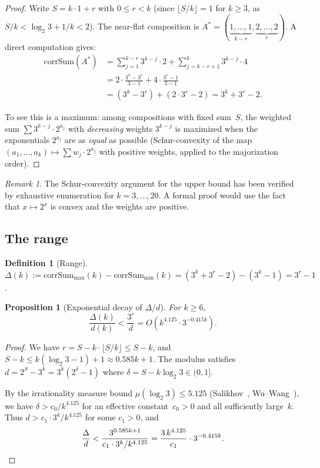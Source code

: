 \documentclass[11pt, a4paper]{amsart}
\theoremstyle{plain}
\newtheorem{proposition}[theorem]{Proposition}
\theoremstyle{definition}
\newtheorem{definition}[theorem]{Definition}
\theoremstyle{remark}
\newtheorem{remark}[theorem]{Remark}
\newcommand{\corrSum}{\mathrm{corrSum}}
\begin{document}
\begin{proof}
  Write $S = k \cdot 1 + r$ with $0 \leq r < k$ (since
  $\lfloor S/k \rfloor = 1$ for $k \geq 3$, as
  $S/k < \log_2 3 + 1/k < 2$).
  The near-flat composition is
  $A^* = (\underbrace{1, \ldots, 1}_{k-r},
           \underbrace{2, \ldots, 2}_{r})$.
  A direct computation gives:
  \begin{align*}
    \corrSum(A^*)
    &= \sum_{j=1}^{k-r} 3^{k-j} \cdot 2
       + \sum_{j=k-r+1}^{k} 3^{k-j} \cdot 4 \\
    &= 2 \cdot \frac{3^k - 3^r}{3 - 1}
       + 4 \cdot \frac{3^r - 1}{3 - 1} \\
    &= (3^k - 3^r) + (2 \cdot 3^r - 2)
    = 3^k + 3^r - 2.
  \end{align*}

  To see this is a maximum: among compositions with fixed sum~$S$,
  the weighted sum $\sum 3^{k-j} \cdot 2^{a_j}$ with
  \emph{decreasing} weights $3^{k-j}$ is maximized when the
  exponentials $2^{a_j}$ are as \emph{equal} as possible
  (Schur-convexity of the map $(a_1, \ldots, a_k) \mapsto
  \sum w_j \cdot 2^{a_j}$ with positive weights, applied to the
  majorization order).
\end{proof}

\begin{remark}\label{rem:schur}
  The Schur-convexity argument for the upper bound has been
  verified by exhaustive enumeration for $k = 3, \ldots, 20$.
  A formal proof would use the fact that $x \mapsto 2^x$ is convex
  and the weights are positive.
\end{remark}

\subsection{The range}\label{ssec:range}

\begin{definition}[Range]\label{def:range}
  $\Delta(k) := \corrSum_{\max}(k) - \corrSum_{\min}(k)
  = (3^k + 3^r - 2) - (3^k - 1) = 3^r - 1$.
\end{definition}

\begin{proposition}[Exponential decay of $\Delta/d$]\label{prop:decay}
  For $k \geq 6$,
  \[
    \frac{\Delta(k)}{d(k)} < \frac{3^r}{d}
    = O\!\left(k^{4.125} \cdot 3^{-0.415k}\right).
  \]
\end{proposition}

\begin{proof}
  We have $r = S - k \cdot \lfloor S/k \rfloor \leq S - k$,
  and $S - k \leq k(\log_2 3 - 1) + 1 \approx 0.585k + 1$.
  The modulus satisfies $d = 2^S - 3^k = 3^k(2^\delta - 1)$
  where $\delta = S - k\log_2 3 \in (0, 1]$.

  By the irrationality measure bound $\mu(\log_2 3) \leq 5.125$
  (Salikhov~\cite{Salikhov2007}, Wu--Wang~\cite{WuWang2014}),
  we have $\delta > c_0 / k^{4.125}$ for an effective
  constant~$c_0 > 0$ and all sufficiently large~$k$.
  Thus $d > c_1 \cdot 3^k / k^{4.125}$ for some $c_1 > 0$, and
  \[
    \frac{\Delta}{d}
    < \frac{3^{0.585k+1}}{c_1 \cdot 3^k / k^{4.125}}
    = \frac{3 \, k^{4.125}}{c_1} \cdot 3^{-0.415k}. \qedhere
  \]
\end{proof}
\end{document}
